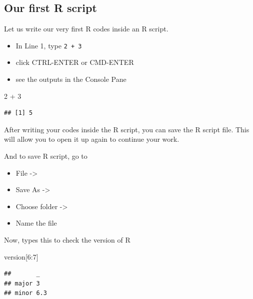 \documentclass[
  10pt,
]{krantz}
\newenvironment{Shaded}{\begin{snugshade}}{\end{snugshade}}
\newcommand{\DecValTok}[1]{\textcolor[rgb]{0.00,0.00,0.81}{#1}}
\newcommand{\NormalTok}[1]{#1}
\newcommand{\SpecialCharTok}[1]{\textcolor[rgb]{0.00,0.00,0.00}{#1}}
\providecommand{\tightlist}{%
  \setlength{\itemsep}{0pt}\setlength{\parskip}{0pt}}
\begin{document}
\hypertarget{our-first-r-script}{%
\subsection{\texorpdfstring{Our first R script}{Our first R script}}\label{our-first-r-script}}

Let us write our very first R codes inside an R script.

\begin{itemize}
\tightlist
\item
  In Line 1, type \texttt{2\ +\ 3}
\item
  click CTRL-ENTER or CMD-ENTER
\item
  see the outputs in the Console Pane
\end{itemize}

\begin{Shaded}
\begin{Highlighting}[]
\DecValTok{2} \SpecialCharTok{+} \DecValTok{3}
\end{Highlighting}
\end{Shaded}

\begin{verbatim}
## [1] 5
\end{verbatim}

After writing your codes inside the R script, you can save the R script file. This will allow you to open it up again to continue your work.

And to save R script, go to

\begin{itemize}
\tightlist
\item
  File -\textgreater{}
\item
  Save As -\textgreater{}
\item
  Choose folder -\textgreater{}\\
\item
  Name the file
\end{itemize}

Now, types this to check the version of R

\begin{Shaded}
\begin{Highlighting}[]
\NormalTok{version[}\DecValTok{6}\SpecialCharTok{:}\DecValTok{7}\NormalTok{]}
\end{Highlighting}
\end{Shaded}

\begin{verbatim}
##       _  
## major 3  
## minor 6.3
\end{verbatim}
\end{document}

